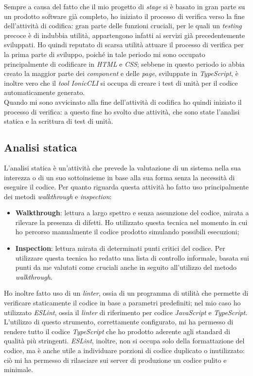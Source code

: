 Sempre a causa del fatto che il mio progetto di \textit{stage} si è basato in gran parte su un prodotto software già completo, ho iniziato il processo di verifica verso la fine dell'attività di codifica: gran parte delle funzioni cruciali, per le quali un \textit{testing} precoce è di indubbia utilità, appartengono infatti ai servizi già precedentemente sviluppati. Ho quindi reputato di scarsa utilità attuare il processo di verifica per la prima parte di sviluppo, poiché in tale periodo mi sono occupato principalmente di codificare in \textit{HTML} e \textit{CSS}; sebbene in questo periodo io abbia creato la maggior parte dei \textit{component} e delle \textit{page}, sviluppate in \textit{TypeScript}, è inoltre vero che il \textit{tool IonicCLI} si occupa di creare i test di unità per il codice automaticamente generato. \\
Quando mi sono avvicinato alla fine dell'attività di codifica ho quindi iniziato il processo di verifica: a questo fine ho svolto due attività, che sono state l'analisi statica e la scrittura di test di unità.


\subsection{Analisi statica}

L'analisi statica è un'attività che prevede la valutazione di un sistema nella sua interezza o di un suo sottoinsieme in base alla sua forma senza la necessità di eseguire il codice. Per quanto riguarda questa attività ho fatto uso principalmente dei metodi \textit{walkthrough} e \textit{inspection}:

\begin{itemize}
  \item \textbf{Walkthrough}: lettura a largo spettro e senza assunzione del codice, mirata a rilevare la presenza di difetti. Ho utilizzato questa tecnica nel momento in cui ho percorso manualmente il codice prodotto simulando possibili esecuzioni;
  \item \textbf{Inspection}: lettura mirata di determinati punti critici del codice. Per utilizzare questa tecnica ho redatto una lista di controllo informale, basata sui punti da me valutati come cruciali anche in seguito all'utilizzo del metodo \textit{walkthrough}.
\end{itemize}

Ho inoltre fatto uso di un \textit{linter}, ossia di un programma di utilità che permette di verificare staticamente il codice in base a parametri predefiniti; nel mio caso ho utilizzato \textit{ESLint}, ossia il \textit{linter} di riferimento per codice \textit{JavaScript} e \textit{TypeScript}. L'utilizzo di questo strumento, correttamente configurato, mi ha permesso di rendere tutto il codice \textit{TypeScript} che ho prodotto aderente agli standard di qualità più stringenti. \textit{ESLint}, inoltre, non si occupa solo della formattazione del codice, ma è anche utile a individuare porzioni di codice duplicato o inutilizzato: ciò mi ha permesso di rilasciare sui server di produzione un codice pulito e minimale. \\

